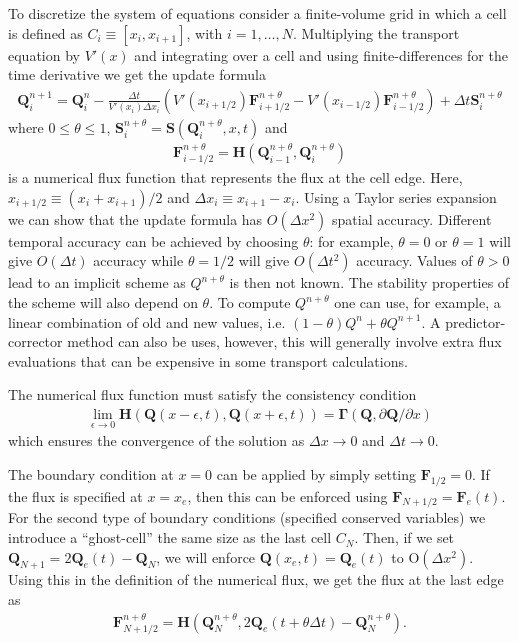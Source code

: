\documentclass[11pt, reqno]{amsart}
\newcommand{\pfracb}[2]{\partial #1/\partial #2}
\newcommand{\mvec}[1]{\mathbf{#1}}
\theoremstyle{definition}
\begin{document}
To discretize the system of equations consider a finite-volume grid in
which a cell is defined as $C_i \equiv [x_i, x_{i+1}]$, with
$i=1,\ldots,N$. Multiplying the transport equation by $V'(x)$ and
integrating over a cell and using finite-differences for the time
derivative we get the update formula
\begin{align}
  \mvec{Q}_i^{n+1} = \mvec{Q}^n_i - \frac{\Delta t}{V'(x_i) \Delta x_i}
  \left (
    V'(x_{i+1/2}) \mvec{F}_{i+1/2}^{n+\theta} - 
    V'(x_{i-1/2}) \mvec{F}_{i-1/2}^{n+\theta}
  \right)
  +
  \Delta t \mvec{S}_i^{n+\theta} \label{eqn:update-form}
\end{align}
where $0\le\theta\le 1$,
$\mvec{S}_i^{n+\theta}=\mvec{S}(\mvec{Q}_i^{n+\theta},x,t)$ and
\begin{align}
  \mvec{F}_{i-1/2}^{n+\theta} = 
  \mvec{H}(
  \mvec{Q}_{i-1}^{n+\theta},
  \mvec{Q}_i^{n+\theta}
  ) \label{eqn:flux-func}
\end{align}
is a numerical flux function that represents the flux at the cell
edge. Here, $x_{i+1/2} \equiv (x_i+x_{i+1})/2$ and $\Delta x_i \equiv
x_{i+1}-x_i$. Using a Taylor series expansion we can show that the
update formula has $O(\Delta x^2)$ spatial accuracy. Different
temporal accuracy can be achieved by choosing $\theta$: for example,
$\theta=0$ or $\theta=1$ will give $O(\Delta t)$ accuracy while
$\theta=1/2$ will give $O(\Delta t^2)$ accuracy. Values of $\theta>0$
lead to an implicit scheme as $Q^{n+\theta}$ is then not known. The
stability properties of the scheme will also depend on $\theta$. To
compute $Q^{n+\theta}$ one can use, for example, a linear combination
of old and new values, i.e. $(1-\theta)Q^n + \theta Q^{n+1}$. A
predictor-corrector method can also be uses, however, this will
generally involve extra flux evaluations that can be expensive in some
transport calculations.

The numerical flux function must satisfy the consistency
condition
\begin{align}
  \lim_{\epsilon\rightarrow 0} \mvec{H}
  \left(
    \mvec{Q}(x-\epsilon,t),
    \mvec{Q}(x+\epsilon,t)
  \right)
  =
  \mvec{\Gamma}(\mvec{Q},\pfracb{\mvec{Q}}{x})
\end{align}
which ensures the convergence of the solution as $\Delta x \rightarrow
0$ and $\Delta t \rightarrow 0$.

The boundary condition at $x=0$ can be applied by simply setting
$\mvec{F}_{1/2}=0$. If the flux is specified at $x=x_e$, then this can
be enforced using $\mvec{F}_{N+1/2}=\mvec{F}_e(t)$. For the second
type of boundary conditions (specified conserved variables) we
introduce a ``ghost-cell'' the same size as the last cell $C_N$. Then,
if we set $\mvec{Q}_{N+1} = 2\mvec{Q}_e(t) - \mvec{Q}_N$, we will
enforce $\mvec{Q}(x_e,t) = \mvec{Q}_e(t)$ to $\textrm{O}(\Delta
x^2)$. Using this in the definition of the numerical flux, we get the
flux at the last edge as
\begin{align}
  \mvec{F}_{N+1/2}^{n+\theta} = \mvec{H}(\mvec{Q}_N^{n+\theta},
  2\mvec{Q}_e(t+\theta\Delta t) - \mvec{Q}_N^{n+\theta}).
\end{align}
\end{document}
